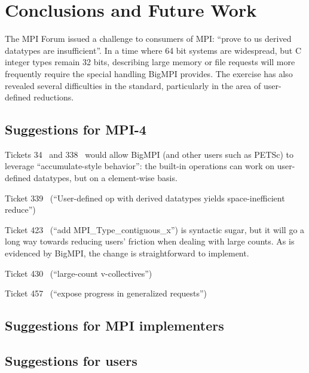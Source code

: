 
\section{Conclusions and Future Work}

The MPI Forum issued a challenge to consumers of MPI: ``prove to us derived
datatypes are insufficient''.  In a time where 64 bit systems are widespread,
but C integer types remain 32 bits, describing large memory or file requests
will more frequently require the special handling BigMPI provides.  The
exercise has also revealed several difficulties in the standard, particularly
in the area of user-defined reductions.

\subsection{Suggestions for MPI-4}

Tickets 34~\cite{ticket34} and 338~\cite{ticket338}
would allow BigMPI (and other users such as PETSc) to leverage ``accumulate-style
behavior'':  the built-in operations can work on user-defined
datatypes, but on a element-wise basis.

Ticket 339~\cite{ticket339} %
(``User-defined op with derived datatypes yields space-inefficient reduce'')

Ticket 423~\cite{ticket423} %
(``add MPI\_Type\_contiguous\_x'') is syntactic sugar, but it will go a long way towards reducing users' friction when dealing with large counts.  As is evidenced by BigMPI, the change is straightforward to implement.

Ticket 430~\cite{ticket430} %
(``large-count v-collectives'')

Ticket 457~\cite{ticket457} %
(``expose progress in generalized requests'')

\subsection{Suggestions for MPI implementers}

\subsection{Suggestions for users}
